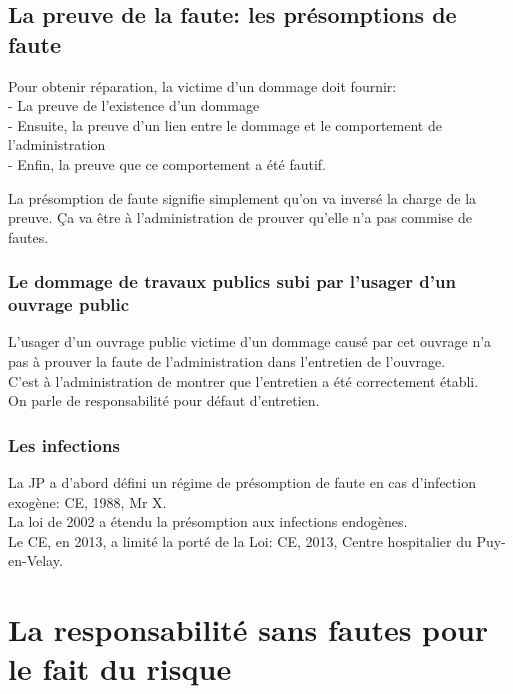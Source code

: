 \documentclass[10pt, a4paper, openany]{book}
\begin{document}
\section{La preuve de la faute: les présomptions de faute}

Pour obtenir réparation, la victime d'un dommage doit fournir: \\
- La preuve de l'existence d'un dommage \\
- Ensuite, la preuve d'un lien entre le dommage et le comportement de l'administration \\
- Enfin, la preuve que ce comportement a été fautif. 


La présomption de faute signifie simplement qu'on va inversé la charge de la preuve. Ça va être à l'administration de prouver qu'elle n'a pas commise de fautes. 

\subsection{Le dommage de travaux publics subi par l'usager d'un ouvrage public}

L'usager d'un ouvrage public victime d'un dommage causé par cet ouvrage n'a pas à prouver la faute de l'administration dans l'entretien de l'ouvrage. \\
C'est à l'administration de montrer que l'entretien a été correctement établi.\\
On parle de responsabilité pour défaut d'entretien.


\subsection{Les infections}

La JP a d'abord défini un régime de présomption de faute en cas d'infection exogène: CE, 1988, Mr X.\\
La loi de 2002 a étendu la présomption aux infections endogènes. \\
Le CE, en 2013, a limité la porté de la Loi: CE, 2013, Centre hospitalier du Puy-en-Velay.  

\chapter{La responsabilité sans fautes pour le fait du risque}
\end{document}
